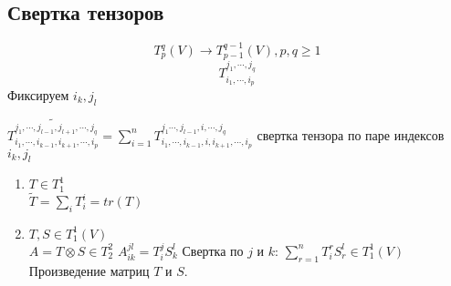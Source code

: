 \subsection{Свертка тензоров}
$$T_{p}^{q}(V) \to T^{q - 1}_{p - 1}(V), p, q \ge 1$$
$$T_{i_1, \cdots, i_p}^{j_1, \cdots, j_q}$$
Фиксируем $i_k, j_l$\\
\begin{Def}
$\widetilde{T_{i_1, \cdots, i_{k - 1}, i_{k + 1}, \cdots, i_p}^{j_1, \cdots, j_{l - 1}, j_{l + 1}, \cdots, j_q}} = \sum_{i = 1}^{n}T_{i_1, \cdots, i_{k - 1}, i, i_{k + 1}, \cdots, i_p}^{j_1\cdots, j_{l - 1}, i, \cdots, j_{q}}$
свертка тензора по паре индексов $i_k, j_l$\\
\end{Def}

\begin{exmp}\hfill
\begin{enumerate}
\item
$T \in T_{1}^{1}$\\
$\widetilde{T} = \sum_{i}T_{i}^{i} = tr(T)$  
\item
$T, S \in T_{1}^{1}(V)$\\
$A = T \otimes S \in T^2_2$
$A^{jl}_{ik} = T_i^jS_k^l$
Свертка по $j$ и $k$: $\sum_{r = 1}^{n}T_i^rS^l_r \in T^{1}_1(V)$
Произведение матриц $T$ и $S$.

\end{enumerate}
\end{exmp}